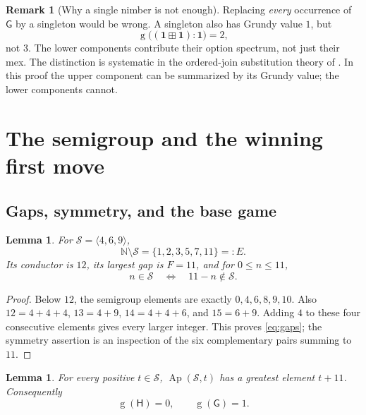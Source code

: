 \documentclass[11pt,letterpaper]{article}
\numberwithin{equation}{section}
\newtheorem{lemma}[theorem]{Lemma}
\theoremstyle{definition}
\newtheorem{remark}[theorem]{Remark}
\newcommand{\N}{\mathbb N}
\newcommand{\Sg}{\mathcal S}
\newcommand{\Gr}{\operatorname{g}}
\newcommand{\Ap}{\operatorname{Ap}}
\newcommand{\ps}{\mathbin{\boxplus}}
\renewcommand{\Game}{\mathsf G}
\newcommand{\Poison}{\mathsf H}
\begin{document}
\begin{remark}[Why a single nimber is not enough]\label{rem:substitution}
Replacing \emph{every} occurrence of $\Game$ by a singleton would be wrong.
A singleton also has Grundy value $1$, but
\[
 \Gr\bigl((\mathbf1\ps\mathbf1):\mathbf1\bigr)=2,
\]
not $3$. The lower components contribute their option spectrum, not just
their mex. The distinction is systematic in the ordered-join substitution
theory of \cite{GT}. In this proof the upper component can be summarized by
its Grundy value; the lower components cannot.
\end{remark}

\section{The semigroup and the winning first move}
\label{sec:counterexample}

\subsection{Gaps, symmetry, and the base game}

\begin{lemma}\label{lem:gaps}
For $\Sg=\langle4,6,9\rangle$,
\begin{equation}\label{eq:gaps}
 \N\setminus\Sg=\{1,2,3,5,7,11\}=:E.
\end{equation}
Its conductor is $12$, its largest gap is $F=11$, and for $0\leq n\leq11$,
\begin{equation}\label{eq:symmetry}
 n\in\Sg\quad\Longleftrightarrow\quad11-n\notin\Sg.
\end{equation}
\end{lemma}

\begin{proof}
Below $12$, the semigroup elements are exactly $0,4,6,8,9,10$.
Also $12=4+4+4$, $13=4+9$, $14=4+4+6$, and $15=6+9$.
Adding $4$ to these four consecutive elements gives every larger integer.
This proves \cref{eq:gaps}; the symmetry assertion is an inspection of the
six complementary pairs summing to $11$.
\end{proof}

\begin{lemma}\label{lem:base-losing}
For every positive $t\in\Sg$, $\Ap(\Sg,t)$ has a greatest element $t+11$.
Consequently
\begin{equation}\label{eq:base-values}
 \Gr(\Poison)=0,\qquad \Gr(\Game)=1.
\end{equation}
\end{lemma}
\end{document}
